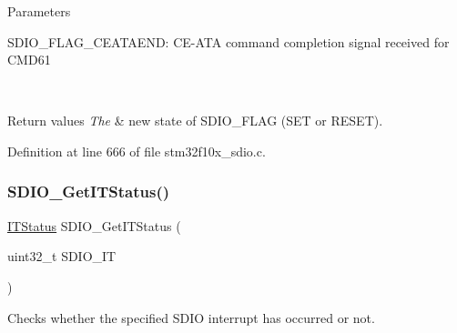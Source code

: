 \begin{DoxyParams}{Parameters}
\begin{DoxyItemize}
S\+D\+I\+O\+\_\+\+F\+L\+A\+G\+\_\+\+C\+E\+A\+T\+A\+E\+ND\+: C\+E-\/\+A\+TA command completion signal received for C\+M\+D61 \end{DoxyItemize}
\\
\hline
\end{DoxyParams}

\begin{DoxyRetVals}{Return values}
{\em The} & new state of S\+D\+I\+O\+\_\+\+F\+L\+AG (S\+ET or R\+E\+S\+ET). \\
\hline
\end{DoxyRetVals}


Definition at line 666 of file stm32f10x\+\_\+sdio.\+c.

\mbox{\label{group___s_d_i_o___exported___functions_ga2d64af1f3df0f99cb518f9a89bbd02ac}} 
\subsubsection{\texorpdfstring{S\+D\+I\+O\+\_\+\+Get\+I\+T\+Status()}{SDIO\_GetITStatus()}}
{\footnotesize\ttfamily \hyperlink{group___exported__types_gaacbd7ed539db0aacd973a0f6eca34074}{I\+T\+Status} S\+D\+I\+O\+\_\+\+Get\+I\+T\+Status (\begin{DoxyParamCaption}\item[{uint32\+\_\+t}]{S\+D\+I\+O\+\_\+\+IT }\end{DoxyParamCaption})}



Checks whether the specified S\+D\+IO interrupt has occurred or not. 


